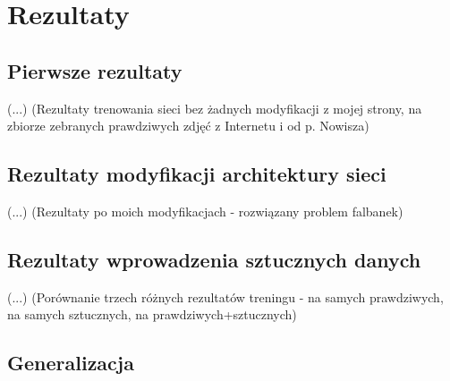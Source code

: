 \chapter{Rezultaty}

\section{Pierwsze rezultaty}

(...) (Rezultaty trenowania sieci bez żadnych modyfikacji z mojej strony, na zbiorze zebranych prawdziwych zdjęć z Internetu i od p. Nowisza)

\section{Rezultaty modyfikacji architektury sieci}

(...) (Rezultaty po moich modyfikacjach - rozwiązany problem falbanek)

\section{Rezultaty wprowadzenia sztucznych danych}

(...) (Porównanie trzech różnych rezultatów treningu - na samych prawdziwych, na samych sztucznych, na prawdziwych+sztucznych)

\section{Generalizacja}
